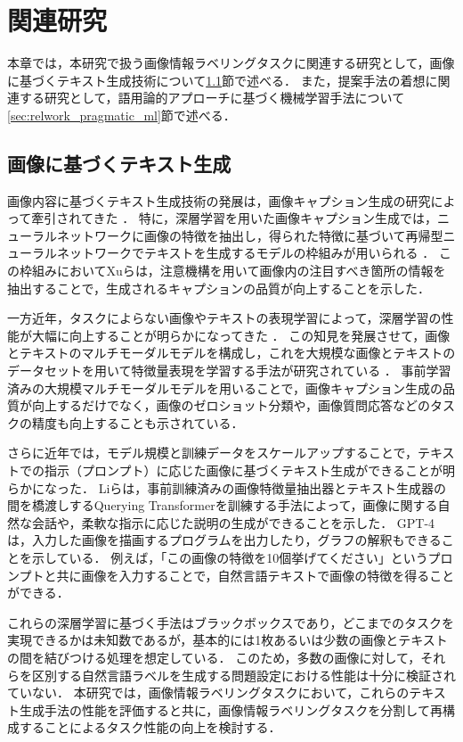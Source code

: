 \documentclass[a4paper,11pt]{jreport}
\begin{document}
\chapter{関連研究}

本章では，本研究で扱う画像情報ラベリングタスクに関連する研究として，画像に基づくテキスト生成技術について\ref{sec:relwork_image_captioning}節で述べる．
また，提案手法の着想に関連する研究として，語用論的アプローチに基づく機械学習手法について\ref{sec:relwork_pragmatic_ml}節で述べる．

\section{画像に基づくテキスト生成}
\label{sec:relwork_image_captioning}
画像内容に基づくテキスト生成技術の発展は，画像キャプション生成の研究によって牽引されてきた \cite{Farhadi2010}．
特に，深層学習を用いた画像キャプション生成では，ニューラルネットワークに画像の特徴を抽出し，得られた特徴に基づいて再帰型ニューラルネットワークでテキストを生成するモデルの枠組みが用いられる \cite{Vinyals2017}．
この枠組みにおいてXuら\cite{Xu2015}は，注意機構を用いて画像内の注目すべき箇所の情報を抽出することで，生成されるキャプションの品質が向上することを示した．

一方近年，タスクによらない画像やテキストの表現学習によって，深層学習の性能が大幅に向上することが明らかになってきた \cite{Devlin2019}．
この知見を発展させて，画像とテキストのマルチモーダルモデルを構成し，これを大規模な画像とテキストのデータセットを用いて特徴量表現を学習する手法が研究されている \cite{Yin2023,Gan2022}．
事前学習済みの大規模マルチモーダルモデルを用いることで，画像キャプション生成の品質が向上する\cite{Dai2023}だけでなく，画像のゼロショット分類\cite{Radford2021}や，画像質問応答\cite{Song2022}などのタスクの精度も向上することも示されている．

さらに近年では，モデル規模と訓練データをスケールアップすることで，テキストでの指示（プロンプト）に応じた画像に基づくテキスト生成ができることが明らかになった．
Liら\cite{Li2023}は，事前訓練済みの画像特徴量抽出器とテキスト生成器の間を橋渡しするQuerying Transformerを訓練する手法によって，画像に関する自然な会話や，柔軟な指示に応じた説明の生成ができることを示した．
GPT-4\cite{Bubeck2023}は，入力した画像を描画するプログラムを出力したり，グラフの解釈もできることを示している．
例えば，「この画像の特徴を10個挙げてください」というプロンプトと共に画像を入力することで，自然言語テキストで画像の特徴を得ることができる．

これらの深層学習に基づく手法はブラックボックスであり，どこまでのタスクを実現できるかは未知数であるが，基本的には1枚あるいは少数の画像とテキストの間を結びつける処理を想定している．
このため，多数の画像に対して，それらを区別する自然言語ラベルを生成する問題設定における性能は十分に検証されていない．
本研究では，画像情報ラベリングタスクにおいて，これらのテキスト生成手法の性能を評価すると共に，画像情報ラベリングタスクを分割して再構成することによるタスク性能の向上を検討する．
\end{document}
